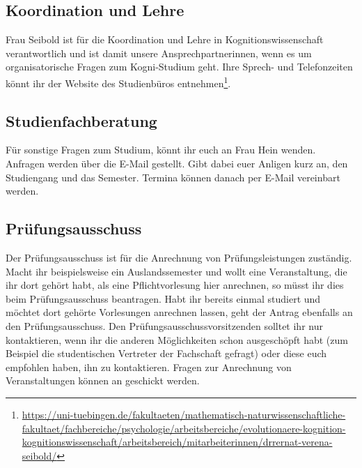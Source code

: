 \subsection*{Koordination und Lehre}
Frau Seibold ist für die Koordination und Lehre in Kognitionswissenschaft verantwortlich und ist damit unsere Ansprechpartnerinnen, wenn es um organisatorische Fragen zum Kogni-Studium geht. Ihre Sprech- und Telefonzeiten könnt ihr der Website des Studienbüros entnehmen\footnote{\url{https://uni-tuebingen.de/fakultaeten/mathematisch-naturwissenschaftliche-fakultaet/fachbereiche/psychologie/arbeitsbereiche/evolutionaere-kognition-kognitionswissenschaft/arbeitsbereich/mitarbeiterinnen/drrernat-verena-seibold/}}.

\subsection*{Studienfachberatung}
Für sonstige Fragen zum Studium, könnt ihr euch an Frau Hein wenden. Anfragen werden über die E-Mail  gestellt. Gibt dabei  euer Anligen kurz an, den Studiengang und das Semester. Termina können danach per E-Mail vereinbart werden.

\subsection*{Prüfungsausschuss} 
Der Prüfungsausschuss ist für die Anrechnung von Prüfungsleistungen zuständig. Macht ihr beispielsweise ein Auslandssemester und wollt eine Veranstaltung, die ihr dort gehört habt, als eine Pflichtvorlesung hier anrechnen, so müsst ihr dies beim Prüfungsausschuss beantragen. Habt ihr bereits einmal studiert und möchtet dort gehörte Vorlesungen anrechnen lassen, geht der Antrag ebenfalls an den Prüfungsausschuss. Den Prüfungsausschussvorsitzenden solltet ihr nur kontaktieren, wenn ihr die anderen Möglichkeiten schon ausgeschöpft habt (zum Beispiel die studentischen Vertreter der Fachschaft gefragt) oder diese euch empfohlen haben, ihn zu kontaktieren. Fragen zur Anrechnung von Veranstaltungen können an  geschickt werden.

